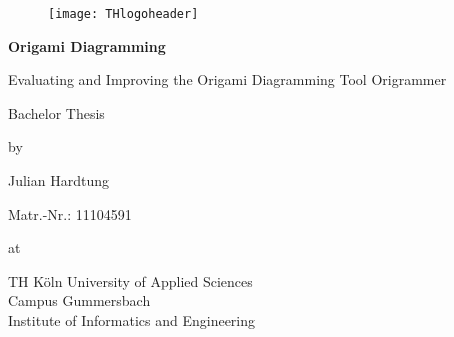 
\begin{titlepage}
	\begin{center}
	
		\begin{figure}[!htbp]
			\texttt{[image: THlogoheader]}
		\end{figure}
		
		\vspace{0.8cm}
		
		\begin{rmfamily}
			\begin{huge}
				\textbf{Origami Diagramming}\\
			\end{huge}
			\vspace{0.5cm}
			\begin{LARGE}
				Evaluating and Improving the Origami Diagramming Tool Origrammer\\
			\end{LARGE}
		\end{rmfamily}
		
		\vspace{1.5cm}
		
		\begin{LARGE}
			\begin{scshape}
				Bachelor Thesis\\[0.8em]
			\end{scshape}
		\end{LARGE}
		
		\begin{large}
			by\\
			\begin{LARGE}
				Julian Hardtung\\
			\end{LARGE}
		\end{large}
		Matr.-Nr.: 11104591\\
		\vfill
		
		\begin{large}
			at\\
			\vspace{0.2cm}
			\begin{scshape}
				TH Köln University of Applied Sciences\\
				Campus Gummersbach\\
				Institute of Informatics and Engineering
			\end{scshape}
		\end{large}
		

\end{center}
\end{titlepage}
